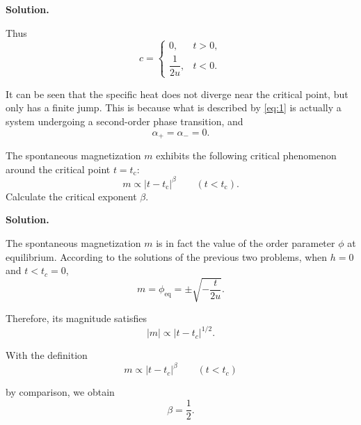 \documentclass[11pt,a4paper]{article}
\newcounter{problem}
\newcounter{saveequation}
\newenvironment{solution}
{
	\par
	\setcounter{saveequation}{\value{equation}}
	\begingroup
	\setcounter{equation}{0}
	\renewcommand{\theequation}{\arabic{problem}.\arabic{equation}}
	\renewcommand{\theHequation}{sol.\arabic{problem}.\arabic{equation}}
	\noindent\textbf{Solution.}\quad
}
{
	\par
	\endgroup
	\setcounter{equation}{\value{saveequation}}
}
\begin{document}
\begin{solution}
		Thus
		\begin{equation}
			c=
			\begin{cases}
				0, & t>0,\\[6pt]
				\dfrac{1}{2u}, & t<0.
			\end{cases}
		\end{equation}
		
		\begin{finalanswer}
			It can be seen that the specific heat does not diverge near the critical point, but only has a finite jump. This is because what is described by \eqref{eq:1} is actually a system undergoing a second-order phase transition, and
			\begin{equation}
				 \label{fin:2}
				\alpha_{+}=\alpha_{-}=0.
			\end{equation}
		\end{finalanswer}
	\end{solution}
	
	\begin{problembox}
		The spontaneous magnetization $m$ exhibits the following critical phenomenon around the critical point $t = t_{\mathrm c}$:
		\begin{equation}
			m \propto |t - t_{\mathrm c}|^{\beta}
			\qquad
			(t < t_{\mathrm c}).
			\tag{3}
		\end{equation}
		Calculate the critical exponent $\beta$.
	\end{problembox}
	\begin{solution}
		The spontaneous magnetization $m$ is in fact the value of the order parameter $\phi$ at equilibrium. According to the solutions of the previous two problems, when $h=0$ and $t<t_c=0$,
		\begin{equation}
			m=\phi_{\mathrm{eq}}=\pm\sqrt{-\frac{t}{2u}}.
		\end{equation}
		
		Therefore, its magnitude satisfies
		\begin{equation}
			|m|\propto |t-t_c|^{1/2}.
		\end{equation}
		
		With the definition
		\begin{equation}
			m\propto |t-t_c|^{\beta} \qquad (t<t_c)
		\end{equation}
		
		\begin{finalanswer}
			by comparison, we obtain
			\begin{equation}
				\label{fin:3}
				\beta=\frac{1}{2}.
			\end{equation}
		\end{finalanswer}
	\end{solution}
	
\end{document}
